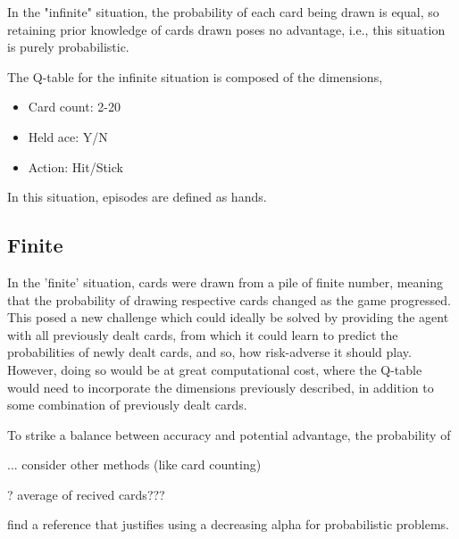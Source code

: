 In the "infinite" situation, the probability of each card being drawn is equal, so retaining prior knowledge of cards drawn poses no advantage, i.e., this situation is purely probabilistic. 

The Q-table for the infinite situation is composed of the dimensions, 
\begin{itemize}
    \item Card count: 2-20
    \item Held ace: Y/N
    \item Action: Hit/Stick
\end{itemize}

In this situation, episodes are defined as hands. 

\subsection{Finite}

In the 'finite' situation, cards were drawn from a pile of finite number, meaning that the probability of drawing respective cards changed as the game progressed. This posed a new challenge which could ideally be solved by providing the agent with all previously dealt cards, from which it could learn to predict the probabilities of newly dealt cards, and so, how risk-adverse it should play. However, doing so would be at great computational cost, where the Q-table would need to incorporate the dimensions previously described, in addition to some combination of previously dealt cards. 

To strike a balance between accuracy and potential advantage, the probability of 

... consider other methods (like card counting)

? average of recived cards???

find a reference that justifies using a decreasing alpha for probabilistic problems. 